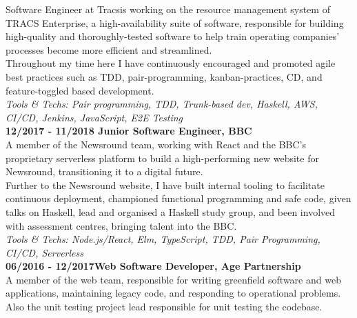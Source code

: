 Software Engineer at Tracsis working on the resource management system of TRACS Enterprise, a high-availability suite of software, responsible for building high-quality and thoroughly-tested software to help train operating companies' processes become more efficient and streamlined.\\

Throughout my time here I have continuously encouraged and promoted agile best practices such as TDD, pair-programming, kanban-practices, CD, and feature-toggled based development.\\

\emph{Tools \& Techs: Pair programming, TDD, Trunk-based dev, Haskell, AWS, CI/CD, Jenkins, JavaScript, E2E Testing}\\

\textbf{12/2017 - 11/2018 \hspace{2.75em}Junior Software Engineer, BBC}\\

A member of the Newsround team, working with React and the BBC's proprietary serverless platform to build a high-performing new website for Newsround, transitioning it to a digital future.\\

Further to the Newsround website, I have built internal tooling to facilitate continuous deployment, championed functional programming and safe code, given talks on Haskell, lead and organised a Haskell study group, and been involved with assessment centres, bringing talent into the BBC.\\

\emph{Tools \& Techs: Node.js/React, Elm, TypeScript, TDD, Pair Programming, CI/CD, Serverless}\\

\textbf{06/2016 - 12/2017\hspace{2.75em}Web Software Developer, Age Partnership}\\

A member of the web team, responsible for writing greenfield software and web applications, maintaining legacy code, and responding to operational problems. Also the unit testing project lead responsible for unit testing the codebase.
